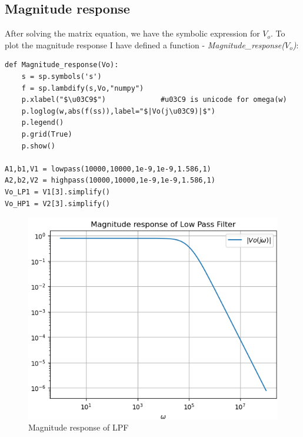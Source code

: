 \documentclass[11pt, a4paper]{article}
\begin{document}
\subsection{Magnitude response}
    After solving the matrix equation, we have the symbolic expression for $V_o$. To plot the magnitude response I have defined a function - \textit{Magnitude\_response($V_o$)}:
    \begin{verbatim}
def Magnitude_response(Vo):
    s = sp.symbols('s')
    f = sp.lambdify(s,Vo,"numpy")
    p.xlabel("$\u03C9$")             #u03C9 is unicode for omega(w)
    p.loglog(w,abs(f(ss)),label="$|Vo(j\u03C9)|$")
    p.legend()
    p.grid(True)
    p.show()

A1,b1,V1 = lowpass(10000,10000,1e-9,1e-9,1.586,1)
A2,b2,V2 = highpass(10000,10000,1e-9,1e-9,1.586,1)
Vo_LP1 = V1[3].simplify()
Vo_HP1 = V2[3].simplify()
    \end{verbatim}
    \begin{figure}[!h]
        \centering
        \includegraphics[scale=0.67]{Figure 1.png}
        \caption{Magnitude response of LPF}
        \label{fig:Figure 1}
    \end{figure}
\end{document}
